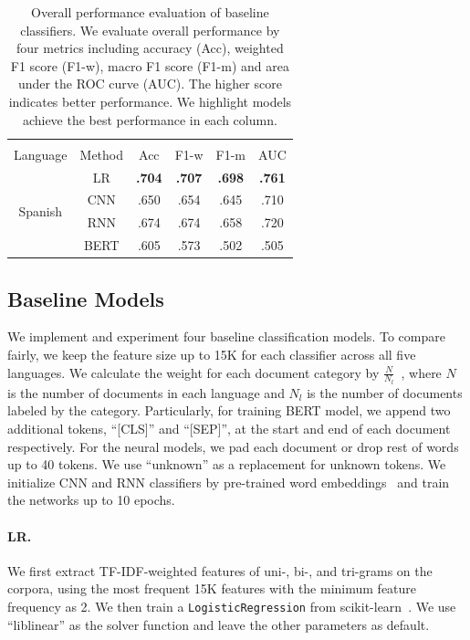 \begin{table}[htp]
\begin{tabular}{cc|cccc}
\multicolumn{6}{c}{} \\
Language & Method & Acc & F1-w & F1-m & AUC \\\hline
\multirow{4}{*}{Spanish} & LR & \textbf{.704} & \textbf{.707} & \textbf{.698} & \textbf{.761} \\
 & CNN & .650 & .654 & .645 & .710\\
 & RNN & .674 & .674 & .658 & .720 \\
 & BERT & .605 & .573 & .502 & .505
\end{tabular}
\caption{Overall performance evaluation of baseline classifiers. We evaluate overall performance by four metrics including accuracy (Acc), weighted F1 score (F1-w), macro F1 score (F1-m) and area under the ROC curve (AUC). The higher score indicates better performance. We highlight models achieve the best performance in each column.}
\label{tab:perform}
\end{table}


\subsection{Baseline Models}
We implement and experiment four baseline classification models. 
To compare fairly, we keep the feature size up to 15K for each classifier across all five languages.
We calculate the weight for each document category by $\frac{N}{N_l}$~\cite{king2001logistic}, where $N$ is the number of documents in each language and $N_l$ is the number of documents labeled by the category.
Particularly, for training BERT model, we append two additional tokens, ``[CLS]'' and ``[SEP]'', at the start and end of each document respectively.
For the neural models, we pad each document or drop rest of words up to 40 tokens.
We use ``unknown'' as a replacement for unknown tokens.
We initialize CNN and RNN classifiers by pre-trained word embeddings~\cite{mikolov2013distributed,godin2015multimedia,bojanowski2017enriching,deriu2017leveraging} and train the networks up to 10 epochs.

\paragraph{LR.} 
We first extract TF-IDF-weighted features of uni-, bi-, and tri-grams on the corpora, using the most frequent 15K features with the minimum feature frequency as 2. 
We then train a \texttt{LogisticRegression} from scikit-learn~\cite{pedregosa2011scikit}. 
We use ``liblinear'' as the solver function and leave the other parameters as default.


